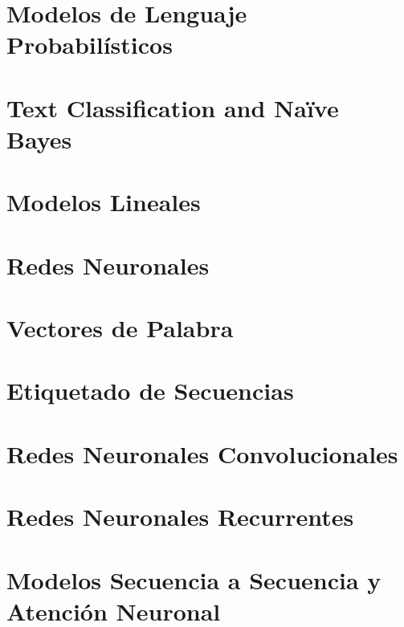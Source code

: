 \documentclass{book}
\begin{document}
\chapter{Modelos de Lenguaje Probabilísticos}
\label{cap_plm}



\chapter{Text Classification and Naïve Bayes}
\label{cap_nb}



\chapter{Modelos Lineales}
\label{cap_lineales}



\chapter{Redes Neuronales}
\label{cap_redes}


\chapter{Vectores de Palabra}
\label{cap_embeddings}


\chapter{Etiquetado de Secuencias}
\label{cap_etisec}




\chapter{Redes Neuronales Convolucionales}
\label{cap_cnn}



\chapter{Redes Neuronales Recurrentes}
\label{cap_rnn}




\chapter{Modelos Secuencia a Secuencia y Atención Neuronal}
\label{cap_sec}
%

\end{document}
